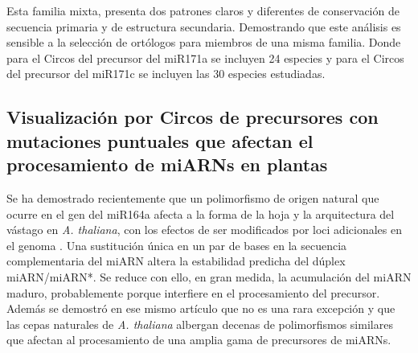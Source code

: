 Esta familia mixta, presenta dos patrones claros y diferentes de conservación de secuencia primaria y de estructura secundaria.
Demostrando que este análisis es sensible a la selección de ortólogos para miembros de una misma familia.
Donde para el Circos del precursor del miR171a se incluyen 24 especies y para el Circos del precursor del miR171c se incluyen las 30 especies estudiadas.



\subsection{Visualización por Circos de precursores con mutaciones puntuales que afectan el procesamiento de miARNs en plantas}

Se ha demostrado recientemente que un polimorfismo de origen natural que ocurre en el gen del miR164a afecta a la forma de la hoja y la arquitectura del vástago en \textit{A. thaliana}, con los efectos de ser modificados por loci adicionales en el genoma \citep{pmid22206705}.
Una sustitución única en un par de bases en la secuencia complementaria del miARN altera la estabilidad predicha del dúplex miARN/miARN*.
Se reduce con ello, en gran medida, la acumulación del miARN maduro, probablemente porque interfiere en el procesamiento del precursor.
Además se demostró en ese mismo artículo que no es una rara excepción y que las cepas naturales de \textit{A. thaliana} albergan decenas de polimorfismos similares que afectan al procesamiento de una amplia gama de precursores de miARNs.

